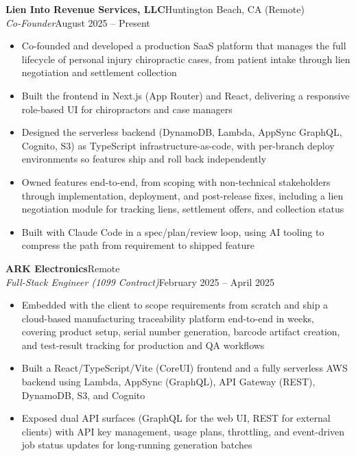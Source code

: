 \documentclass[10.5pt, letterpaper]{article}
\newcommand{\jobentry}[4]{%
  \noindent
  \textbf{\color{accent}#1}\hfill\textcolor{muted}{\small #2}\\
  \textit{#3}\hfill\textcolor{muted}{\small #4}%
}
\begin{document}
\jobentry{Lien Into Revenue Services, LLC}{Huntington Beach, CA (Remote)}{Co-Founder}{August 2025 -- Present}
\begin{itemize}
  \item Co-founded and developed a production SaaS platform that manages the full
        lifecycle of personal injury chiropractic cases, from patient intake through
        lien negotiation and settlement collection
  \item Built the frontend in Next.js (App Router) and React, delivering a responsive
        role-based UI for chiropractors and case managers
  \item Designed the serverless backend (DynamoDB, Lambda, AppSync GraphQL, Cognito,
        S3) as TypeScript infrastructure-as-code, with per-branch deploy environments
        so features ship and roll back independently
  \item Owned features end-to-end, from scoping with non-technical stakeholders through
        implementation, deployment, and post-release fixes, including a lien
        negotiation module for tracking liens, settlement offers, and collection status
  \item Built with Claude Code in a spec/plan/review loop, using AI tooling to compress
        the path from requirement to shipped feature
\end{itemize}

\vspace{5pt}

\jobentry{ARK Electronics}{Remote}{Full-Stack Engineer \normalfont\small(1099 Contract)}{February 2025 -- April 2025}
\begin{itemize}
  \item Embedded with the client to scope requirements from scratch and ship a
        cloud-based manufacturing traceability platform end-to-end in weeks, covering
        product setup, serial number generation, barcode artifact creation, and
        test-result tracking for production and QA workflows
  \item Built a React/TypeScript/Vite (CoreUI) frontend and a fully serverless AWS
        backend using Lambda, AppSync (GraphQL), API Gateway (REST), DynamoDB,
        S3, and Cognito
  \item Exposed dual API surfaces (GraphQL for the web UI, REST for external clients)
        with API key management, usage plans, throttling, and event-driven job status
        updates for long-running generation batches
\end{itemize}
\end{document}
